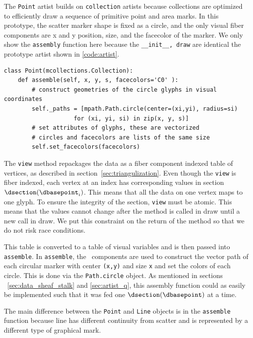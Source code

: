\documentclass[../main.tex]{subfiles}
\begin{document}
The \texttt{Point} artist builds on \texttt{collection} artists because collections are optimized to efficiently draw a sequence of primitive point and area marks. In this prototype, the scatter marker shape is fixed as a circle, and the only visual fiber components are x and y position, size, and the facecolor of the marker. We only show the \texttt{assembly} function here because the \texttt{__init__, draw} are identical the prototype artist shown in \ref{code:artist}. 
\begin{verbatim}
class Point(mcollections.Collection):
    def assemble(self, x, y, s, facecolors='C0' ):
        # construct geometries of the circle glyphs in visual coordinates
        self._paths = [mpath.Path.circle(center=(xi,yi), radius=si) 
                    for (xi, yi, si) in zip(x, y, s)] 
        # set attributes of glyphs, these are vectorized 
        # circles and facecolors are lists of the same size
        self.set_facecolors(facecolors)
\end{verbatim} 
The \texttt{view} method repackages the data as a fiber component indexed table of vertices, as described in section~\ref{sec:triangulization}. Even though the \texttt{view} is fiber indexed, each vertex at an index \dbasepoint has corresponding values in section $\dsection(\dbasepoint_{i})$. This means that all the data on one vertex maps to one glyph. To ensure the integrity of the section, \texttt{view} must be atomic. This means that the values cannot change after the method is called in draw until a new call in draw. We put this constraint on the return of the  method so that we do not risk race conditions. 

This table is converted to a table of visual variables and is then passed into \texttt{assemble}. In  \texttt{assemble}, the \vsection\ components are used to construct the vector path of each circular marker with center \texttt{(x,y)} and size \texttt{x} and set the colors of each circle. This is done via the \texttt{Path.circle} object. As mentioned in sections ~\ref{sec:data_sheaf_stalk} and \ref{sec:artist_q}, this assembly function could as easily be implemented such that it was fed one $\dsection(\dbasepoint)$ at a time. 

The main difference between the \texttt{Point} and \texttt{Line} objects is in the \texttt{assemble} function because line has different continuity from scatter and is represented by a different type of graphical mark. 
\end{document}
